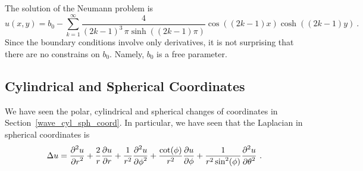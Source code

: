 \begin{egg}
The solution of the Neumann problem is
\[
u(x,y) = b_0
- \sum_{k=1}^\infty \frac{4}{(2k-1)^3\,\pi \sinh\left((2k-1)\pi\right)}
\cos\left( (2k-1) x\right) \cosh\left((2k-1) y\right) \ .
\]
Since the boundary conditions involve only derivatives, it is not
surprising that there are no constrains on $b_0$.  Namely, $b_0$
is a free parameter.
\end{egg}

\subsection{Cylindrical and Spherical Coordinates}

We have seen the polar, cylindrical and spherical changes of
coordinates in Section~\ref{wave_cyl_sph_coord}.  In particular, we
have seen that the Laplacian in spherical coordinates is
\[
\Delta u = \frac{\displaystyle \partial^{2}{u}} {\displaystyle \partial r^{2}} + \frac{2}{r} \frac{\partial{u}}{\partial r}
+ \frac{1}{r^2} \frac{\displaystyle \partial^{2}{u}} {\displaystyle \partial \phi^{2}} + \frac{\cot(\phi)}{r^2}
\frac{\partial{u}}{\partial \phi} + \frac{1}{r^2\sin^2(\phi)}
\frac{\displaystyle \partial^{2}{u}} {\displaystyle \partial \theta^{2}} \ .
\]

